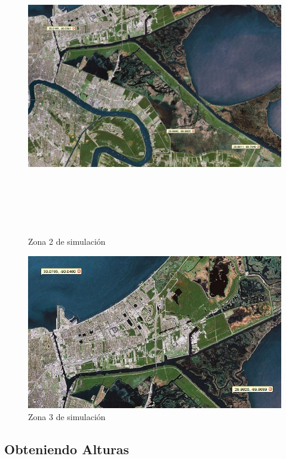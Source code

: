 \begin{figure}[H]
 \centering
 \includegraphics[height=130mm,angle=90]{figuras/cap6/NOarea3.png}
 \caption{Zona 2 de simulación}
\end{figure}

\begin{figure}[H]
 \centering
 \includegraphics[width=135mm]{figuras/cap6/NOarea4.png}
 \caption{Zona 3 de simulación}
\end{figure}


\subsection*{Obteniendo Alturas}

